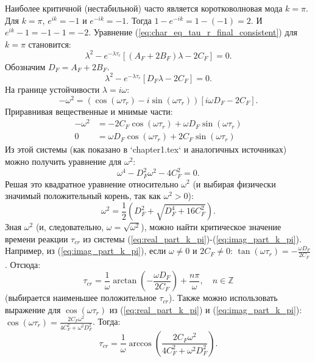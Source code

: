 \documentclass[12pt, a4paper]{article}
\begin{document}
Наиболее критичной (нестабильной) часто является коротковолновая мода $k=\pi$. Для $k=\pi$, $e^{ik}=-1$ и $e^{-ik}=-1$.
Тогда $1-e^{-ik} = 1 - (-1) = 2$. И $e^{ik}-1 = -1-1 = -2$.
Уравнение (\ref{eq:char_eq_tau_r_final_consistent}) для $k=\pi$ становится:
\begin{equation}
\label{eq:char_eq_tau_r_k_pi}
\lambda^2 - e^{-\lambda \tau_r} \left[ (A_F + 2B_F)\lambda - 2C_F \right] = 0.
\end{equation}
Обозначим $D_F = A_F + 2B_F$.
\begin{equation}
\label{eq:char_eq_tau_r_k_pi_D}
\lambda^2 - e^{-\lambda \tau_r} [D_F \lambda - 2C_F] = 0.
\end{equation}
На границе устойчивости $\lambda = i\omega$:
\[ -\omega^2 = (\cos(\omega \tau_r) - i\sin(\omega \tau_r)) [i\omega D_F - 2C_F]. \]
Приравнивая вещественные и мнимые части:
\begin{align}
-\omega^2 &= -2C_F \cos(\omega \tau_r) + \omega D_F \sin(\omega \tau_r) \label{eq:real_part_k_pi} \\
0 &= \omega D_F \cos(\omega \tau_r) + 2C_F \sin(\omega \tau_r) \label{eq:imag_part_k_pi}
\end{align}
Из этой системы (как показано в `chapter1.tex` и аналогичных источниках) можно получить уравнение для $\omega^2$:
\[ \omega^4 - D_F^2 \omega^2 - 4C_F^2 = 0. \]
Решая это квадратное уравнение относительно $\omega^2$ (и выбирая физически значимый положительный корень, так как $\omega^2 > 0$):
\begin{equation}
\label{eq:omega_sq_solution}
\omega^2 = \frac{1}{2} \left( D_F^2 + \sqrt{D_F^4 + 16C_F^2} \right).
\end{equation}
Зная $\omega^2$ (и, следовательно, $\omega = \sqrt{\omega^2}$), можно найти критическое значение времени реакции $\tau_{cr}$ из системы (\ref{eq:real_part_k_pi})-(\ref{eq:imag_part_k_pi}). Например, из (\ref{eq:imag_part_k_pi}), если $\omega \neq 0$ и $2C_F \neq 0$:
$\tan(\omega \tau_r) = -\frac{\omega D_F}{2C_F}$. Отсюда:
\begin{equation}
\label{eq:tau_cr_final}
\tau_{cr} = \frac{1}{\omega} \arctan\left(-\frac{\omega D_F}{2C_F}\right) + \frac{n\pi}{\omega}, \quad n \in \mathbb{Z}
\end{equation}
(выбирается наименьшее положительное $\tau_{cr}$). Также можно использовать выражение для $\cos(\omega \tau_r)$ из (\ref{eq:real_part_k_pi}) и (\ref{eq:imag_part_k_pi}):
$\cos(\omega \tau_r) = \frac{2C_F \omega^2}{4C_F^2 + \omega^2 D_F^2}$.
Тогда:
\[ \tau_{cr} = \frac{1}{\omega} \arccos\left(\frac{2C_F \omega^2}{4C_F^2 + \omega^2 D_F^2}\right). \]
\end{document}
